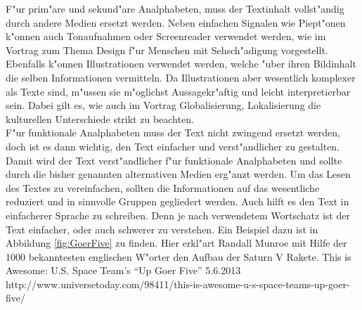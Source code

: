 F"ur prim"are und sekund"are Analphabeten, muss der Textinhalt vollst"andig durch andere Medien ersetzt werden. Neben einfachen Signalen wie Piept"onen k"onnen auch Tonaufnahmen oder Screenreader verwendet werden, wie im Vortrag zum Thema  \glqq Design f"ur Menschen mit Sehsch"adigung\grqq{} vorgestellt.
Ebenfalls k"onnen Illustrationen verwendet werden, welche "uber ihren Bildinhalt die selben Informationen vermitteln.
Da Illustrationen aber wesentlich komplexer als Texte sind, m"ussen sie m"oglichst Aussagekr"aftig und leicht interpretierbar sein. Dabei gilt es, wie auch im Vortrag \glqq Globalisierung, Lokalisierung\grqq{} die kulturellen Unterschiede strikt zu beachten.\\
F"ur funktionale Analphabeten muss der Text nicht zwingend ersetzt werden, doch ist es dann wichtig, den Text einfacher und verst"andlicher zu gestalten. Damit wird der Text verst"andlicher f"ur funktionale Analphabeten und sollte durch die bisher genannten alternativen Medien erg"anzt werden. Um das Lesen des Textes zu vereinfachen, sollten die Informationen auf das wesentliche reduziert und in sinnvolle Gruppen gegliedert werden. Auch hilft es den Text in einfacherer Sprache zu schreiben. Denn je nach verwendetem Wortschatz ist der Text einfacher, oder auch schwerer zu verstehen. Ein Beispiel dazu ist in Abbildung \ref{fig:GoerFive} zu finden. Hier erkl"art Randall Munroe mit Hilfe der 1000 bekanntesten englischen W"orter den Aufbau der Saturn V Rakete.
				{This is Awesome: U.S. Space Team’s “Up Goer Five”}
				{5.6.2013}
				{http://www.universetoday.com/98411/this-is-awesome-u-s-space-teams-up-goer-five/}

